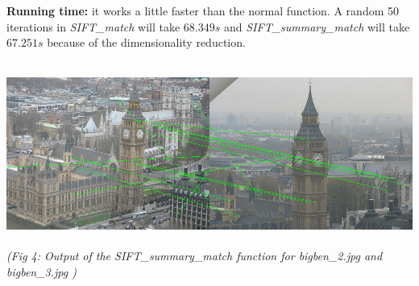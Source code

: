 \documentclass{article}
\begin{document}
\begin{enumerate}
				\textbf{Running time:} it works a little faster than the normal function. A random 50 iterations in \textit{SIFT\_match} will take $68.349s$ and \textit{SIFT\_summary\_match} will take $67.251s$ because of the dimensionality reduction.		
				
										
		\begin{center}
			\includegraphics[height=6cm,width=16cm]{3a} \\
			\textit{	(Fig 4: Output of the SIFT\_summary\_match function for bigben\_2.jpg and bigben\_3.jpg )}
		\end{center}
		
	\end{enumerate}
		
	
\end{document}
